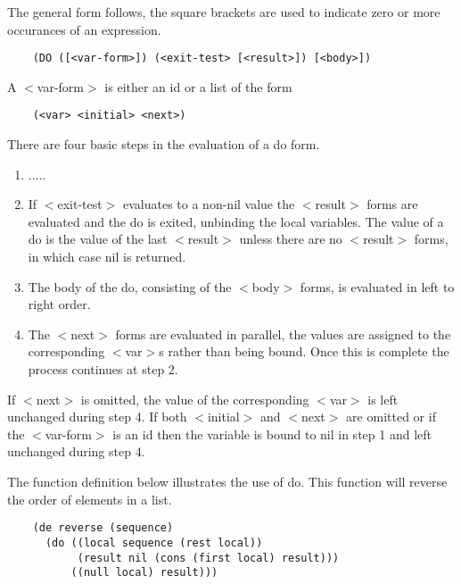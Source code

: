 {    The general form follows, the square brackets  are  used  to
    indicate zero or more occurances of an expression.
}
\begin{verbatim}
    (DO ([<var-form>]) (<exit-test> [<result>]) [<body>])
\end{verbatim}
    A $<$var-form$>$ is either an id or a list of the form

\begin{verbatim}
    (<var> <initial> <next>)
\end{verbatim}
    
There are four basic steps in the evaluation of a do form.
\begin{enumerate}
\item  .....
\item  If  $<$exit-test$>$  evaluates  to  a  non-nil  value   the
         $<$result$>$  forms  are  evaluated  and  the do is exited,
         unbinding the local variables.  The value of  a  do  is
         the  value  of  the  last  $<$result$>$ unless there are no
         $<$result$>$ forms, in which case nil is returned.
\item The body of the do, consisting of the $<$body$>$ forms,  is
         evaluated in left to right order.
\item       The  $<$next$>$ forms are evaluated in parallel, the values
         are assigned to the corresponding  $<$var$>$s  rather  than
         being  bound.    Once  this  is  complete  the  process
         continues at step 2.
\end{enumerate}

    If $<$next$>$ is omitted, the value of the  corresponding  $<$var$>$
    is  left  unchanged  during  step  4.  If both $<$initial$>$ and
    $<$next$>$ are omitted or if the $<$var-form$>$ is an  id  then  the
    variable is bound to nil in step 1 and left unchanged during
    step 4.

    The  function  definition  below  illustrates the use of do.
    This function will reverse the order of elements in a list.

\begin{verbatim}
    (de reverse (sequence)
      (do ((local sequence (rest local))
           (result nil (cons (first local) result)))
          ((null local) result)))
\end{verbatim}

